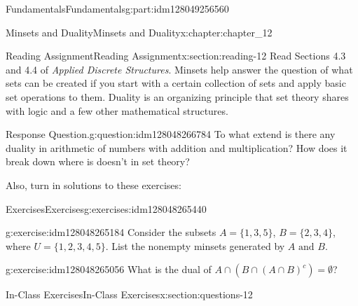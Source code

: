 \documentclass[oneside,10pt,]{book}
\numberwithin{equation}{section}
\begin{document}
\begin{partptx}{Fundamentals}{}{Fundamentals}{}{}{g:part:idm128049256560}
\typeout{************************************************}
%
\begin{chapterptx}{Minsets and Duality}{}{Minsets and Duality}{}{}{x:chapter:chapter_12}
\index{}%
%
%
\typeout{************************************************}
\typeout{************************************************}
%
\begin{sectionptx}{Reading Assignment}{}{Reading Assignment}{}{}{x:section:reading-12}
Read Sections 4.3 and 4.4 of \emph{Applied Discrete Structures}. Minsets help answer the question of what sets can be created if you start with a certain collection of sets and apply basic set operations to them.   Duality is an organizing principle that set theory shares with logic and a few other mathematical structures.%
\begin{question}{Response Question.}{g:question:idm128048266784}%
To what extend is there any duality in arithmetic of numbers with addition and multiplication?  How does it break down where is doesn't in set theory?%
\end{question}
Also, turn in solutions to these exercises:%
%
%
\typeout{************************************************}
\typeout{************************************************}
%
\begin{exercises-subsection}{Exercises}{}{Exercises}{}{}{g:exercises:idm128048265440}
\par\medskip\noindent%
%
\begin{exercisegroup}
\begin{divisionexerciseeg}{1}{}{}{g:exercise:idm128048265184}%
Consider the subsets \(A = \{1, 3, 5\}\), \(B = \{2,3,4\}\),  where \(U = \{1,2,3,4,5\}\).  List the nonempty minsets generated by \(A\textrm{ and }B\).%
\end{divisionexerciseeg}%
\begin{divisionexerciseeg}{2}{}{}{g:exercise:idm128048265056}%
What is the dual of \(A \cap (B\cap (A\cap B)^c)= \emptyset\)?%
\end{divisionexerciseeg}%
\end{exercisegroup}
\par\medskip\noindent
\end{exercises-subsection}
\end{sectionptx}
%
%
\typeout{************************************************}
\typeout{************************************************}
%
\begin{sectionptx}{In-Class Exercises}{}{In-Class Exercises}{}{}{x:section:questions-12}

\end{sectionptx}
\end{chapterptx}
\end{partptx}
\end{document}
